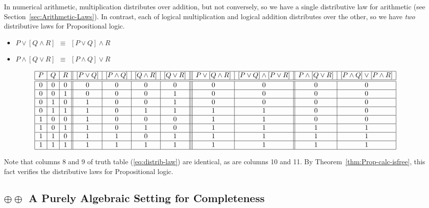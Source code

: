 \noindent
In numerical arithmetic, multiplication distributes over addition, but not conversely, so we have a single distributive law for arithmetic (see Section~\ref{sec:Arithmetic-Laws}).  In contrast, each of logical multiplication and logical addition distributes over the other, so we have {\em two} distributive laws for Propositional logic.
\begin{itemize}
\item
$ P \vee [ Q \wedge R] \ \ \equiv \ \ [P \vee Q] \wedge R$
\medskip\item
$P \wedge [ Q \vee R] \ \ \equiv \ \ [P \wedge Q] \vee R$
\end{itemize}
{\small
\begin{equation}
\label{eq:distrib-law}
\begin{array}{|c|c|c||c|c|c|c|||c|c||c|c|}
\hline
P & Q & R
  & [P \vee Q]
  & [P \wedge Q]
  & [Q \wedge R] 
  & [Q \vee R] 
  & P \vee [ Q \wedge R]
  & [P \vee Q] \wedge [P \vee R]
  & P \wedge [ Q \vee R]
  & [P \wedge Q] \vee [P \wedge R] \\
\hline
\hline
0 & 0 & 0
  & 0
  & 0
  & 0
  & 0
  & 0
  & 0
  & 0
  & 0 \\ 
\hline
0 & 0 & 1
  & 0
  & 0
  & 0
  & 1
  & 0
  & 0
  & 0 
  & 0 \\
\hline
0 & 1 & 0
  & 1
  & 0
  & 0
  & 1
  & 0
  & 0
  & 0
  & 0 \\
\hline
0 & 1 & 1
  & 1
  & 0
  & 1
  & 1
  & 1
  & 1
  & 0
  & 0 \\
\hline
1 & 0 & 0
  & 1
  & 0
  & 0
  & 0
  & 1
  & 1
  & 0
  & 0 \\
\hline
1 & 0 & 1
  & 1
  & 0
  & 1
  & 0
  & 1
  & 1
  & 1
  & 1 \\
\hline
1 & 1 & 0
  & 1
  & 1
  & 0
  & 1
  & 1
  & 1
  & 1
  & 1 \\
\hline
1 & 1 & 1
  & 1
  & 1
  & 1
  & 1
  & 1
  & 1
  & 1
  & 1 \\
\hline
\end{array}
\end{equation}
}

Note that columns 8 and 9 of truth table (\ref{eq:distrib-law}) are identical, as are columns 10 and 11.  By Theorem~\ref{thm:Prop-calc-isfree}, this fact verifies the distributive laws for Propositional logic.


\subsection{$\oplus \oplus$ A Purely Algebraic Setting for Completeness}


